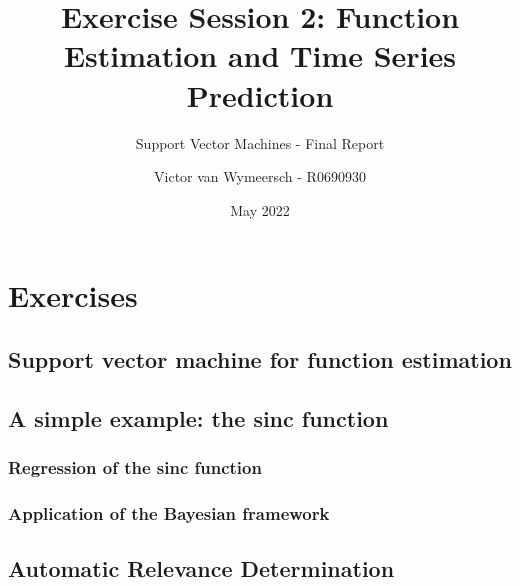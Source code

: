 \documentclass{article}
\title{Exercise Session 2: Function Estimation and Time Series Prediction}
\subtitle{Support Vector Machines - Final Report}
\author{Victor van Wymeersch - R0690930}
\date{May 2022}
\begin{document}
\maketitle

    
    
\section{Exercises} 
    \subsection{Support vector machine for function estimation} 
    
    \subsection{A simple example: the sinc function}
    
        \subsubsection{Regression of the sinc function}
        
        \subsubsection{Application of the Bayesian framework}
        
    \subsection{Automatic Relevance Determination}
    
\end{document}
